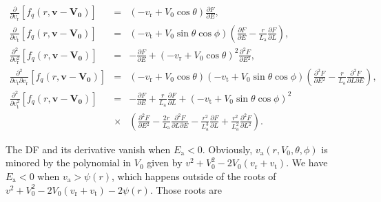 \documentclass[11pt]{article}
\newcommand{\rt}{\mathrm{t}}
\newcommand{\rr}{\mathrm{r}}
\newcommand{\vr}{v_{\rr}}
\newcommand{\vt}{v_{\rt}}
\newcommand{\bv}{\boldsymbol{v}}
\newcommand{\fq}{f_{q}}
\newcommand{\ra}{\mathrm{a}}
\newcommand{\va}{v_{\ra}}
\newcommand{\bV}[1]{\boldsymbol{V_{#1}}}
\newcommand{\Ea}{E_{\ra}}
\newcommand{\La}{L_{\ra}}
\begin{document}
\begin{equation}
\begin{array}{ccl}
  \displaystyle{\frac{\partial}{\partial \vr}\left[\fq(r,\bv-\bV0)\right]} & =&\displaystyle{\left(-\vr+V_{0}\cos\theta\right)\frac{\partial F}{\partial E}} ,\\
  
   \displaystyle{\frac{\partial}{\partial \vt}\left[\fq(r,\bv-\bV0)\right]} & =&\displaystyle{\left(-\vt+V_{0}\sin\theta\cos\phi\right)\left(\frac{\partial F}{\partial E}-\frac{r}{\La}\frac{\partial F}{\partial L}\right)} ,\\
 
  \displaystyle{\frac{\partial^{2}}{\partial \vr^{2}}\left[\fq(r,\bv-\bV0)\right]} & =&\displaystyle{-\frac{\partial F}{\partial E}+\left(-\vr+V_{0}\cos\theta\right)^{2}\frac{\partial^{2}F}{\partial E{}^{2}}} ,\\
 
  \displaystyle{\frac{\partial^{2}}{\partial \vt\partial \vr}\left[\fq(r,\bv-\bV0)\right]} & =&\displaystyle{\left(-\vr+V_{0}\cos\theta\right)\left(-\vt+V_{0}\sin\theta\cos\phi\right)\left(\frac{\partial^{2}F}{\partial E{}^{2}}-\frac{r}{\La}\frac{\partial^{2}F}{\partial L\partial E}\right)} ,\\
 
  \displaystyle{\frac{\partial^{2}}{\partial \vt^{2}}\left[\fq(r,\bv-\bV0)\right]} & =&\displaystyle{-\frac{\partial F}{\partial E}+\frac{r}{\La}\frac{\partial F}{\partial L}+\left(-\vt+V_{0}\sin\theta\cos\phi\right)^{2}} \\
  {}&\times& \displaystyle{\left(\frac{\partial^{2}F}{\partial E{}^{2}}-\frac{2r}{\La}\frac{\partial^{2}F}{\partial L\partial E}-\frac{r^{2}}{\La^{3}}\frac{\partial F}{\partial L}+\frac{r^{2}}{\La^{2}}\frac{\partial^{2}F}{\partial L{}^{2}}\right)} .
\end{array}
\label{eq:DF_Derivatives}
\end{equation}

The DF and its derivative vanish when $\Ea<0$. Obviously, $\va(r,V_{0},\theta,\phi)$ is minored by the polynomial in $V_{0}$ given by $v^{2}+V_{0}^{2}-2V_{0}(\vr+\vt)$. We have $\Ea<0$ when $\va>\psi(r)$, which happens outside of the roots of $v^{2}+V_{0}^{2}-2V_{0}(\vr+\vt)-2\psi(r)$. Those roots are
\end{document}
